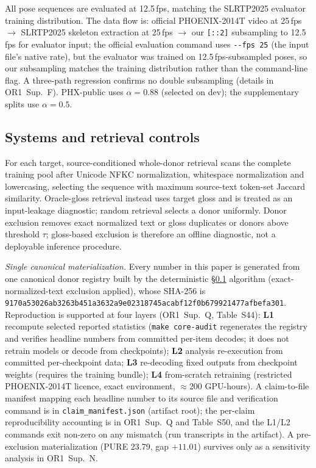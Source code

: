 \documentclass[pdflatex,sn-chicago]{sn-jnl}
\begin{document}
All pose sequences are evaluated at 12.5\,fps, matching the SLRTP2025 evaluator training distribution. The data flow is: official PHOENIX-2014T video at 25\,fps $\to$ SLRTP2025 skeleton extraction at 25\,fps $\to$ our \texttt{[::2]} subsampling to 12.5\,fps for evaluator input; the official evaluation command uses \texttt{-{}-fps 25} (the input file's native rate), but the evaluator was trained on 12.5\,fps-subsampled poses, so our subsampling matches the training distribution rather than the command-line flag. A three-path regression confirms no double subsampling (details in OR1~Sup.~F). PHX-public uses $\alpha{=}0.88$ (selected on dev); the supplementary splits use $\alpha{=}0.5$.

\subsection{Systems and retrieval controls}
\label{sec:retrieval}
For each target, source-conditioned whole-donor retrieval scans the complete training pool after Unicode NFKC normalization, whitespace normalization and lowercasing, selecting the sequence with maximum source-text token-set Jaccard similarity. Oracle-gloss retrieval instead uses target gloss and is treated as an input-leakage diagnostic; random retrieval selects a donor uniformly. Donor exclusion removes exact normalized text or gloss duplicates or donors above threshold $\tau$; gloss-based exclusion is therefore an offline diagnostic, not a deployable inference procedure.

\emph{Single canonical materialization.} Every number in this paper is generated from one canonical donor registry built by the deterministic \S\ref{sec:retrieval} algorithm (exact-normalized-text exclusion applied), whose SHA-256 is \texttt{9170a53026ab3263b451a3632a9e02\-318745acabf12f0b679921477afbefa301}. Reproduction is supported at four layers (OR1~Sup.~Q, Table~S44): \textbf{L1} recompute selected reported statistics (\texttt{make core-audit} regenerates the registry and verifies headline numbers from committed per-item decodes; it does not retrain models or decode from checkpoints); \textbf{L2} analysis re-execution from committed per-checkpoint data; \textbf{L3} re-decoding fixed outputs from checkpoint weights (requires the training bundle); \textbf{L4} from-scratch retraining (restricted PHOENIX-2014T licence, exact environment, $\approx$200 GPU-hours). A claim-to-file manifest mapping each headline number to its source file and verification command is in \texttt{claim\_manifest.json} (artifact root); the per-claim reproducibility accounting is in OR1~Sup.~Q and Table~S50, and the L1/L2 commands exit non-zero on any mismatch (run transcripts in the artifact). A pre-exclusion materialization (PURE 23.79, gap $+11.01$) survives only as a sensitivity analysis in OR1~Sup.~N.
\end{document}
